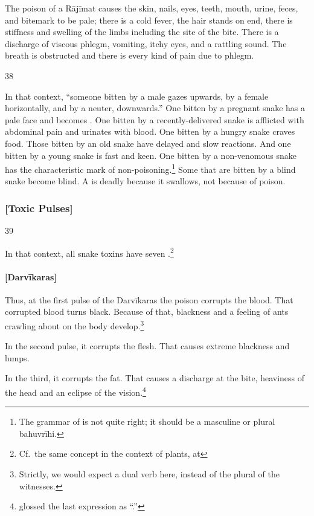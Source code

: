 \begin{translation}
The poison of a Rājīmat causes the skin, nails, eyes, teeth, mouth,
urine, feces, and bitemark to be pale; there  is a cold fever, the hair
stands on end, there is stiffness and swelling of the limbs including the
site of the bite. There is a discharge of viscous phlegm, vomiting, itchy
eyes, and a rattling sound.  The breath is obstructed and there is every
kind of pain due to phlegm.


\item[38]

In that context, “someone bitten by a male gazes upwards,   by a female
horizontally, and by a neuter, downwards.” One bitten by a pregnant snake
has a pale face and becomes . One bitten by a
recently-delivered snake is afflicted with abdominal pain and urinates
with blood. One bitten by a hungry snake craves food.  Those bitten by an
old snake have delayed and slow reactions. And one bitten by a young
snake is fast and keen.  One bitten by a non-venomous snake has the
characteristic mark of non-poisoning.\footnote{The grammar of
     is not quite right; it should be a masculine or plural
    bahuvrīhi.} Some that are bitten by a blind snake become blind.  A
     is deadly because it swallows, not because of
    poison.

\subsubsection{[Toxic Pulses]}

\item[39]

In that context, all snake toxins have seven .\footnote{Cf.\ the same concept in the context of plants, at 
\pageref{stagesofshock}}

\paragraph{[Darvīkaras]}   

Thus, at the first pulse of the Darvīkaras the poison corrupts the blood.
That corrupted blood turns black.  Because of that, blackness and a
feeling of ants crawling about on the body develop.\footnote{Strictly, we
    would expect a dual verb here, instead of the plural of the witnesses.}

In the second pulse, it corrupts the flesh.  That causes extreme blackness and  
lumps. 

In the third, it corrupts the fat. That causes a discharge at the bite,
heaviness of the head and an eclipse of the
vision.\footnote{ glossed the last expression as
    “.”}
    

\end{translation}
